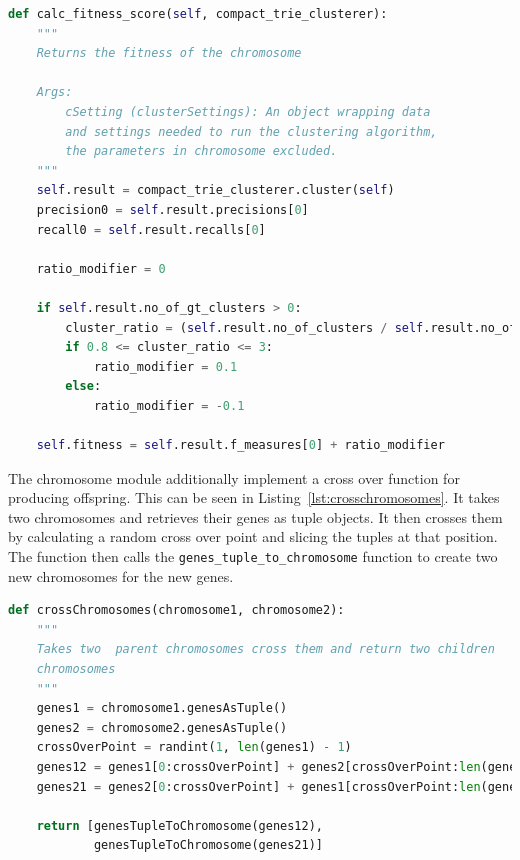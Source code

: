 \begin{lstlisting}[float=ht, language=python, breaklines=true, label=lst:chromosomefitness, caption={Fitness function in the Chromosome class.}]
def calc_fitness_score(self, compact_trie_clusterer):
    """
    Returns the fitness of the chromosome

    Args:
        cSetting (clusterSettings): An object wrapping data
        and settings needed to run the clustering algorithm,
        the parameters in chromosome excluded.
    """
    self.result = compact_trie_clusterer.cluster(self)
    precision0 = self.result.precisions[0]
    recall0 = self.result.recalls[0]

    ratio_modifier = 0

    if self.result.no_of_gt_clusters > 0:
        cluster_ratio = (self.result.no_of_clusters / self.result.no_of_gt_clusters)
        if 0.8 <= cluster_ratio <= 3:
            ratio_modifier = 0.1
        else:
            ratio_modifier = -0.1

    self.fitness = self.result.f_measures[0] + ratio_modifier
\end{lstlisting}

The chromosome module additionally implement a cross over function for producing offspring. This can be seen in Listing~\ref{lst:crosschromosomes}. It takes two chromosomes and retrieves their genes as tuple objects. It then crosses them by calculating a random cross over point and slicing the tuples at that position. The function then calls the \texttt{genes\_tuple\_to\_chromosome} function to create two new chromosomes for the new genes.

\begin{lstlisting}[float=ht, language=python, breaklines=true, label=lst:crosschromosomes, caption={Code for crossing chromosomes}]
def crossChromosomes(chromosome1, chromosome2):
    """
    Takes two  parent chromosomes cross them and return two children
    chromosomes
    """
    genes1 = chromosome1.genesAsTuple()
    genes2 = chromosome2.genesAsTuple()
    crossOverPoint = randint(1, len(genes1) - 1)
    genes12 = genes1[0:crossOverPoint] + genes2[crossOverPoint:len(genes2)]
    genes21 = genes2[0:crossOverPoint] + genes1[crossOverPoint:len(genes1)]

    return [genesTupleToChromosome(genes12),
            genesTupleToChromosome(genes21)]
\end{lstlisting}

